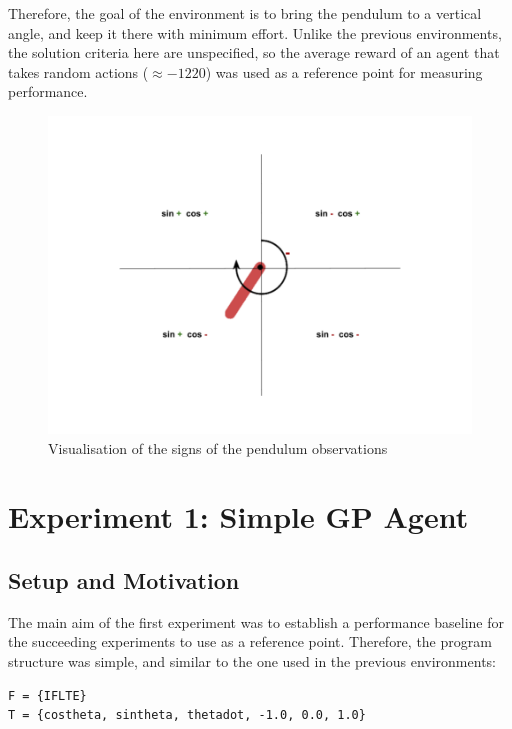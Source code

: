 Therefore, the goal of the environment is to bring the pendulum to a vertical angle, and keep it there with minimum effort. Unlike the previous environments, the solution criteria here are unspecified, so the average reward of an agent that takes random actions ($\approx-1220$) was used as a reference point for measuring performance.

\begin{figure}[ht]
    \centering
    \includegraphics[width=12cm]{images/pendulum_quadrants.png}
    \caption{Visualisation of the signs of the pendulum observations}
    \label{fig:pendulum_quadrants}
\end{figure}

\section{Experiment 1: Simple GP Agent}

\subsection{Setup and Motivation}
The main aim of the first experiment was to establish a performance baseline for the succeeding experiments to use as a reference point. Therefore, the program structure was simple, and similar to the one used in the previous environments:

\begin{verbatim}
F = {IFLTE}
T = {costheta, sintheta, thetadot, -1.0, 0.0, 1.0}
\end{verbatim}

